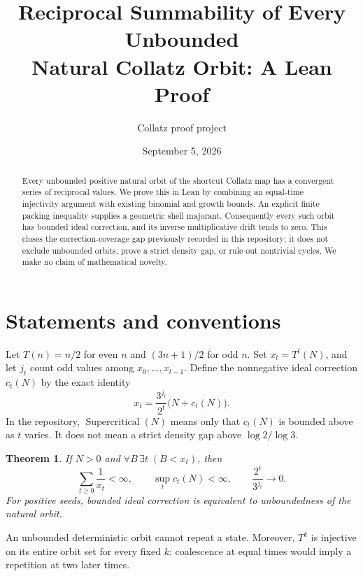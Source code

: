 \documentclass[10pt]{article}
\title{Reciprocal Summability of Every Unbounded\\Natural Collatz Orbit: A Lean Proof}
\author{Collatz proof project}
\date{September 5, 2026}
\newtheorem{theorem}{Theorem}
\begin{document}
\maketitle
\begin{abstract}
Every unbounded positive natural orbit of the shortcut Collatz map has a
convergent series of reciprocal values. We prove this in Lean by combining
an equal-time injectivity argument with existing binomial and growth bounds.
An explicit finite packing inequality supplies a geometric shell majorant.
Consequently every such orbit has bounded ideal correction, and its inverse
multiplicative drift tends to zero. This closes the correction-coverage gap
previously recorded in this repository; it does not exclude unbounded
orbits, prove a strict density gap, or rule out nontrivial cycles. We make
no claim of mathematical novelty.
\end{abstract}

\section{Statements and conventions}
Let $T(n)=n/2$ for even $n$ and $(3n+1)/2$ for odd $n$.
Set $x_t=T^t(N)$, and let $j_t$ count odd values among $x_0,\ldots,x_{t-1}$.
Define the nonnegative ideal correction $c_t(N)$ by the exact identity
\[
x_t=\frac{3^{j_t}}{2^t}\bigl(N+c_t(N)\bigr).
\]
In the repository, $\operatorname{Supercritical}(N)$ means only that
$c_t(N)$ is bounded above as $t$ varies. It does not mean a strict density
gap above $\log 2/\log 3$.
\begin{theorem}
If $N>0$ and $\forall B\,\exists t\;(B<x_t)$, then
\[
\sum_{t\ge0}\frac1{x_t}<\infty,
\qquad \sup_t c_t(N)<\infty,
\qquad \frac{2^t}{3^{j_t}}\longrightarrow0.
\]
For positive seeds, bounded ideal correction is equivalent to unboundedness
of the natural orbit.
\end{theorem}
An unbounded deterministic orbit cannot repeat a state. Moreover,
$T^k$ is injective on its entire orbit set for every fixed $k$: coalescence
at equal times would imply a repetition at two later times.
\end{document}
